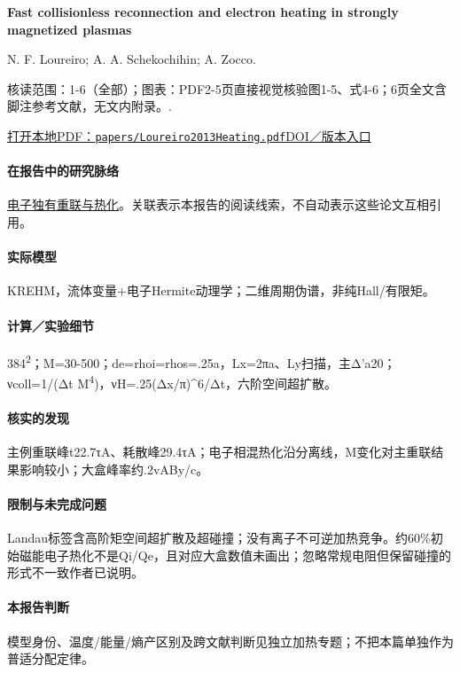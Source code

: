 \documentclass[UTF8,a4paper,11pt,openany,fontset=fandol]{ctexbook}
\begin{document}
\textbf{Fast collisionless reconnection and electron heating in strongly magnetized plasmas}\citep{Loureiro2013Heating}\

N. F. Loureiro;  A. A. Schekochihin;  A. Zocco.

\textsf{核读范围：}1-6（全部）；\textsf{图表：}PDF2-5页直接视觉核验图1-5、式4-6；6页全文含脚注参考文献，无文内附录。.

\href{run:../papers/Loureiro2013Heating.pdf}{打开本地PDF：\texttt{papers/Loureiro2013Heating.pdf}}\quad\href{https://doi.org/10.1103/PhysRevLett.111.025002}{DOI／版本入口}

\paragraph{在报告中的研究脉络}\hyperref[story:energy]{电子独有重联与热化}。关联表示本报告的阅读线索，不自动表示这些论文互相引用。

\paragraph{实际模型}KREHM，流体变量+电子Hermite动理学；二维周期伪谱，非纯Hall/有限矩。

\paragraph{计算／实验细节}384\textsuperscript{2}；M=30-500；de=rhoi=rhos=.25a，Lx=2πa、Ly扫描，主Δ'a20；νcoll=1/(Δt M\textsuperscript{4})，νH=.25(Δx/π)\textasciicircum{}6/Δt，六阶空间超扩散。

\paragraph{核实的发现}主例重联峰t22.7τA、耗散峰29.4τA；电子相混热化沿分离线，M变化对主重联结果影响较小；大盒峰率约.2vABy/c。

\paragraph{限制与未完成问题}Landau标签含高阶矩空间超扩散及超碰撞；没有离子不可逆加热竞争。约60\%初始磁能电子热化不是Qi/Qe，且对应大盒数值未画出；忽略常规电阻但保留碰撞的形式不一致作者已说明。

\paragraph{本报告判断}模型身份、温度/能量/熵产区别及跨文献判断见独立加热专题；不把本篇单独作为普适分配定律。
\end{document}
